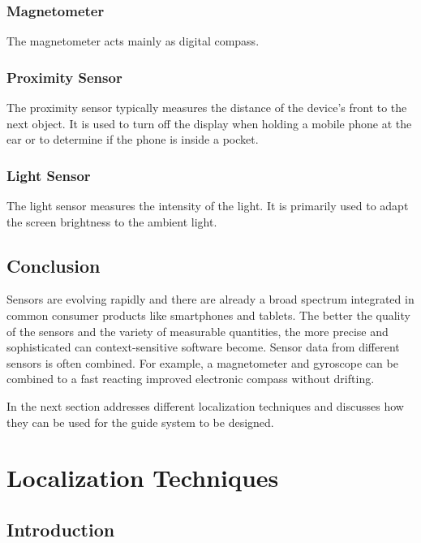 \subsubsection*{Magnetometer}

The magnetometer acts mainly as digital compass.

\subsubsection*{Proximity Sensor}

The proximity sensor typically measures the distance of the device's front to the next object. It is used to turn off the display when holding a mobile phone at the ear or to determine if the phone is inside a pocket.

\subsubsection*{Light Sensor}

The light sensor measures the intensity of the light. It is primarily used to adapt the screen brightness to the ambient light.

\subsection{Conclusion}

Sensors are evolving rapidly and there are already a broad spectrum integrated in common consumer products like smartphones and tablets. The better the quality of the sensors and the variety of measurable quantities, the more precise and sophisticated can context-sensitive software become.
Sensor data from different sensors is often combined. For example, a magnetometer and gyroscope can be combined to a fast reacting improved electronic compass without drifting. %

In the next section addresses different localization techniques and discusses how they can be used for the guide system to be designed.  

\section{Localization Techniques}

\subsection{Introduction}

